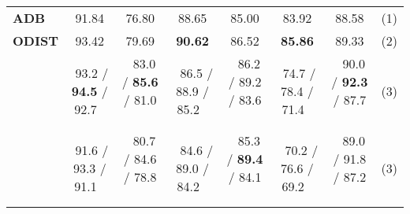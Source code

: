 \documentclass[runningheads]{llncs}
\begin{document}
\begin{table}[b]
\begin{adjustbox}{width=1\textwidth}
\begin{tabular}{l|cc|cc|cc|c}
\textbf{ADB}                & 91.84                & 76.80                & 88.65                & 85.00                & 83.92                & 88.58                & (1)  \\
\textbf{ODIST}              & 93.42                & 79.69                & \textbf{90.62}       & 86.52                & \textbf{85.86}       & 89.33                & (2)  \\ \hline
    & \,\,93.2 /  \textbf{94.5} /  92.7 \,\,&\,\, 83.0 /  \textbf{85.6} /  81.0 \,\, &\,\, 86.5 /  88.9 /  85.2 \,\,&\,\, 86.2 /  89.2 /  83.6 \,\,& \,\,74.7 /  78.4 /  71.4 \,\,&\,\, 90.0 /  \textbf{92.3} /  87.7 \,\,& (3)  \\
 & \,\,91.6 /  93.3 /  91.1 \,\,&\,\, 80.7 /  84.6 /  78.8 \,\,&\,\, 84.6 /  89.0 /  84.2 \,\,& \,\, 85.3 /  \textbf{89.4} /  84.1 \,\, & \,\, 70.2 /  76.6 /  69.2 \,\, & \,\, 89.0 /  91.8 /  87.2 \,\, & (3) 
\end{tabular}
\end{adjustbox}

\end{table}
\end{document}

